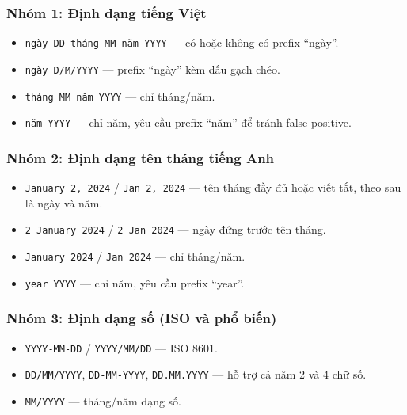 \subsubsection*{Nhóm 1: Định dạng tiếng Việt}

\begin{itemize}[nosep]
      \item \texttt{ngày DD tháng MM năm YYYY} --- có hoặc không có prefix
            ``ngày''.
      \item \texttt{ngày D/M/YYYY} --- prefix ``ngày'' kèm dấu gạch chéo.
      \item \texttt{tháng MM năm YYYY} --- chỉ tháng/năm.
      \item \texttt{năm YYYY} --- chỉ năm, yêu cầu prefix ``năm'' để tránh
            false positive.
\end{itemize}

\subsubsection*{Nhóm 2: Định dạng tên tháng tiếng Anh}

\begin{itemize}[nosep]
      \item \texttt{January 2, 2024} / \texttt{Jan 2, 2024} --- tên tháng đầy
            đủ hoặc viết tắt, theo sau là ngày và năm.
      \item \texttt{2 January 2024} / \texttt{2 Jan 2024} --- ngày đứng trước
            tên tháng.
      \item \texttt{January 2024} / \texttt{Jan 2024} --- chỉ tháng/năm.
      \item \texttt{year YYYY} --- chỉ năm, yêu cầu prefix ``year''.
\end{itemize}

\subsubsection*{Nhóm 3: Định dạng số (ISO và phổ biến)}

\begin{itemize}[nosep]
      \item \texttt{YYYY-MM-DD} / \texttt{YYYY/MM/DD} --- ISO 8601.
      \item \texttt{DD/MM/YYYY}, \texttt{DD-MM-YYYY}, \texttt{DD.MM.YYYY} ---
            hỗ trợ cả năm 2 và 4 chữ số.
      \item \texttt{MM/YYYY} --- tháng/năm dạng số.
\end{itemize}


